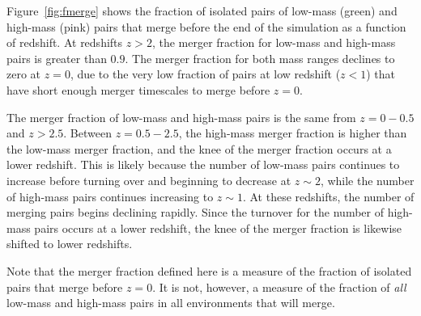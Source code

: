 \documentclass[twocolumn,linenumbers]{aastex631}
\begin{document}
Figure~\ref{fig:fmerge} shows the fraction of isolated pairs of low-mass (green) and high-mass (pink) pairs that merge before the end of the simulation as a function of redshift. 
At redshifts $z>2$, the merger fraction for low-mass and high-mass pairs is greater than $0.9$.
The merger fraction for both mass ranges declines to zero at $z=0$, due to the very low fraction of pairs at low redshift ($z<1$) that have short enough merger timescales to merge before $z=0$.

The merger fraction of low-mass and high-mass pairs is the same from $z=0-0.5$ and $z>2.5$. 
Between $z=0.5-2.5$, the high-mass merger fraction is higher than the low-mass merger fraction, and the knee of the merger fraction occurs at a lower redshift.
This is likely because the number of low-mass pairs continues to increase before turning over and beginning to decrease at $z\sim2$, while the number of high-mass pairs continues increasing to $z\sim1$. 
At these redshifts, the number of merging pairs begins declining rapidly. 
Since the turnover for the number of high-mass pairs occurs at a lower redshift, the knee of the merger fraction is likewise shifted to lower redshifts.

Note that the merger fraction defined here is a measure of the fraction of isolated pairs that merge before $z=0$. It is not, however, a measure of the fraction of \textit{all} low-mass and high-mass pairs in all environments that will merge. 




\end{document}
